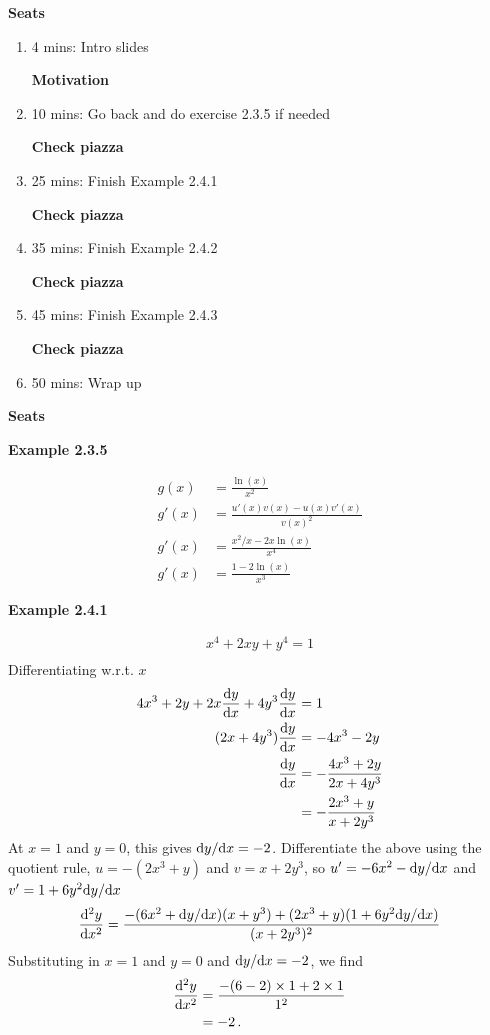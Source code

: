 \textbf{Seats}
\begin{enumerate}
    \item 4 mins: Intro slides \par
    \textbf{Motivation}
    \item 10 mins: Go back and do exercise 2.3.5 if needed \par
    \textbf{Check piazza}
    \item 25 mins: Finish Example 2.4.1 \par
    \textbf{Check piazza}
    \item 35 mins: Finish Example 2.4.2 \par
    \textbf{Check piazza}
    \item 45 mins: Finish Example 2.4.3 \par
    \textbf{Check piazza}
    \item 50 mins: Wrap up \par
\end{enumerate}
\textbf{Seats}

\vspace{10mm}
\textbf{Example 2.3.5}

\begin{align*}
    g(x) &= \frac{\ln(x)}{x^2}\\
    g'(x) &=\frac{u'(x)v(x)-u(x)v'(x)}{v(x)^2}\\
    g'(x) &= \frac{x^2/x-2x\ln(x)}{x^4}\\
    g'(x) &= \frac{1-2\ln(x)}{x^3}
\end{align*}

\vspace{10mm}
\textbf{Example 2.4.1}

\begin{align*}
    x^4 + 2xy + y^4 = 1 \\
\end{align*}
Differentiating w.r.t. $x$
\begin{align*}
    4x^3 + 2y + 2x\frac{{\rm d}y}{{\rm d}x} + 4y^3\frac{{\rm d}y}{{\rm d}x} &= 1 \\
    (2x + 4y^3)\frac{{\rm d}y}{{\rm d}x} &= -4x^3 - 2y\\
    \frac{{\rm d}y}{{\rm d}x} &= -\frac{4x^3 + 2y}{2x + 4y^3}\\
    &= -\frac{2x^3 + y}{x + 2y^3}
\end{align*}
At $x=1$ and $y=0$, this gives ${\rm d}y/{\rm d}x = -2$. Differentiate the above using the quotient rule, $u=-(2x^3+y)$ and $v=x+2y^3$, so $u'=-6x^2-{\rm d}y/{\rm d}x$ and $v' = 1 + 6y^2 {\rm d}y/{\rm d}x$
\begin{align*}
    \frac{{\rm d}^2y}{{\rm d}x^2} &= \frac{-(6x^2+{\rm d}y/{\rm d}x)(x+y^3)+(2x^3+y)(1 + 6y^2 {\rm d}y/{\rm d}x)}{(x+2y^3)^2}\\
\end{align*}
Substituting in $x=1$ and $y=0$ and ${\rm d}y/{\rm d}x = -2$, we find 
\begin{align*}
    \frac{{\rm d}^2y}{{\rm d}x^2} &= \frac{-(6-2)\times 1 + 2 \times 1}{1^2}\\
    &= -2 \,.
\end{align*}

